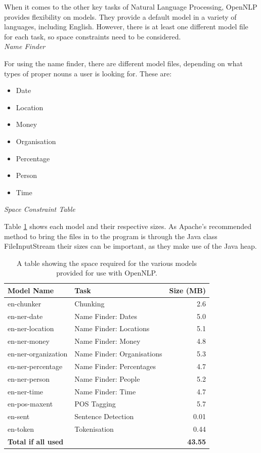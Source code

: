 \documentclass[12pt]{article}
\begin{document}
When it comes to the other key tasks of Natural Language Processing, OpenNLP provides flexibility on models. They provide a default model in a variety of languages, including English. However, there is at least one different model file for each task, so space constraints need to be considered. \\

\emph{Name Finder}

For using the name finder, there are different model files, depending on what types of proper nouns a user is looking for. These are: 

\begin{itemize}
	\item Date
	\item Location
	\item Money
	\item Organisation
	\item Percentage
	\item Person
	\item Time \\
\end{itemize} 

\emph{Space Constraint Table}

Table \ref{opennlpspace} shows each model and their respective sizes. As Apache's recommended method to bring the files in to the program is through the Java class FileInputStream their sizes can be important, as they make use of the Java heap.

\begin{table}[H]
	\centering
	\begin{tabular}{l|l|r}
		\textbf{Model Name} & \textbf{Task} & \textbf{Size (MB)} \\ \hline
		en-chunker & Chunking & 2.6 \\ \hline
		en-ner-date & Name Finder: Dates & 5.0 \\ \hline
		en-ner-location & Name Finder: Locations & 5.1 \\ \hline
		en-ner-money & Name Finder: Money & 4.8 \\ \hline
		en-ner-organization & Name Finder: Organisations & 5.3 \\ \hline
		en-ner-percentage & Name Finder: Percentages & 4.7 \\ \hline
		en-ner-person & Name Finder: People & 5.2 \\ \hline
		en-ner-time & Name Finder: Time & 4.7 \\ \hline
		en-pos-maxent & POS Tagging & 5.7 \\ \hline
		en-sent & Sentence Detection & 0.01 \\ \hline
		en-token & Tokenisation & 0.44 \\ \hline
		\textbf{Total if all used} & & \textbf{43.55} \\ \hline
	\end{tabular}
	\caption[Space used for OpenNLP models]{A table showing the space required for the various models provided for use with OpenNLP.}
	\label{opennlpspace}
\end{table}
\end{document}
